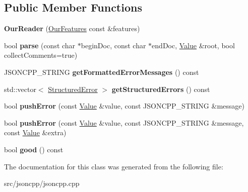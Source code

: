 \subsection*{Public Member Functions}
\begin{DoxyCompactItemize}
\item 
{\bfseries Our\+Reader} (\hyperlink{classJson_1_1OurFeatures}{Our\+Features} const \&features)\hypertarget{classJson_1_1OurReader_a48a850914b9c8d7781be172930c478e5}{}\label{classJson_1_1OurReader_a48a850914b9c8d7781be172930c478e5}

\item 
bool {\bfseries parse} (const char $\ast$begin\+Doc, const char $\ast$end\+Doc, \hyperlink{classJson_1_1Value}{Value} \&root, bool collect\+Comments=true)\hypertarget{classJson_1_1OurReader_aba4f8749aab7f02ec17f107e392caf80}{}\label{classJson_1_1OurReader_aba4f8749aab7f02ec17f107e392caf80}

\item 
J\+S\+O\+N\+C\+P\+P\+\_\+\+S\+T\+R\+I\+NG {\bfseries get\+Formatted\+Error\+Messages} () const \hypertarget{classJson_1_1OurReader_a61b627b274f3bf110d559e4ab50e29b8}{}\label{classJson_1_1OurReader_a61b627b274f3bf110d559e4ab50e29b8}

\item 
std\+::vector$<$ \hyperlink{structJson_1_1OurReader_1_1StructuredError}{Structured\+Error} $>$ {\bfseries get\+Structured\+Errors} () const \hypertarget{classJson_1_1OurReader_a02ef7871af3706754a233c36e6d489e9}{}\label{classJson_1_1OurReader_a02ef7871af3706754a233c36e6d489e9}

\item 
bool {\bfseries push\+Error} (const \hyperlink{classJson_1_1Value}{Value} \&value, const J\+S\+O\+N\+C\+P\+P\+\_\+\+S\+T\+R\+I\+NG \&message)\hypertarget{classJson_1_1OurReader_a700e9d8e0977fa7e0375d26690d7025f}{}\label{classJson_1_1OurReader_a700e9d8e0977fa7e0375d26690d7025f}

\item 
bool {\bfseries push\+Error} (const \hyperlink{classJson_1_1Value}{Value} \&value, const J\+S\+O\+N\+C\+P\+P\+\_\+\+S\+T\+R\+I\+NG \&message, const \hyperlink{classJson_1_1Value}{Value} \&extra)\hypertarget{classJson_1_1OurReader_addccecfca74b79adaad6115ddd614477}{}\label{classJson_1_1OurReader_addccecfca74b79adaad6115ddd614477}

\item 
bool {\bfseries good} () const \hypertarget{classJson_1_1OurReader_a048346238d703ad9aed06beb686e6102}{}\label{classJson_1_1OurReader_a048346238d703ad9aed06beb686e6102}

\end{DoxyCompactItemize}


The documentation for this class was generated from the following file\+:\begin{DoxyCompactItemize}
\item 
src/jsoncpp/jsoncpp.\+cpp\end{DoxyCompactItemize}
